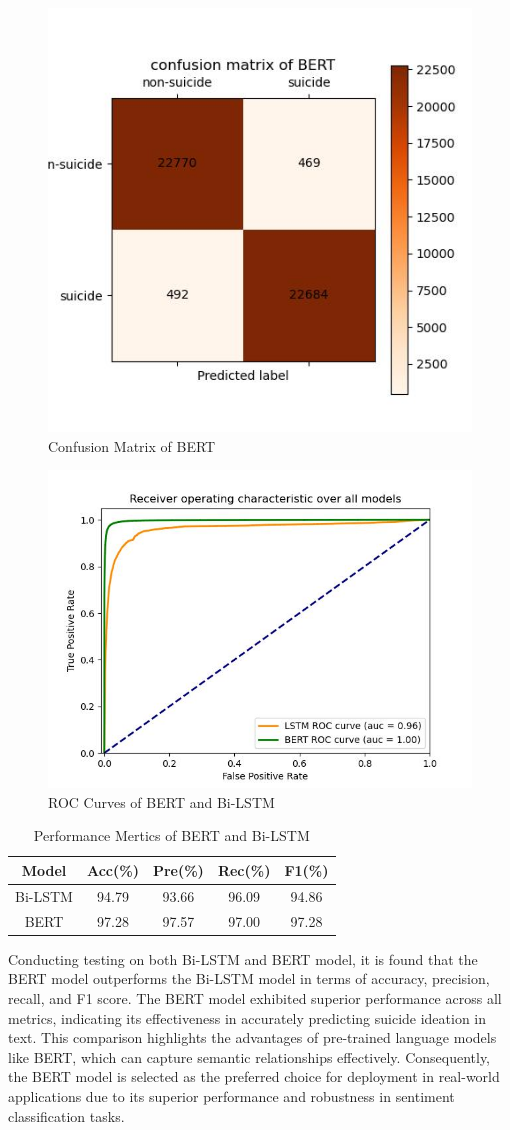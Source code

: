 \documentclass[ %
                    author={Bocheng Wang},
                supervisor={Dr. Qiang Liu},
                    degree={MSc},
                     title={A Research on Identification of Suicide Ideation in Texts with Multiple Models},
                      type={},
                      year={2024}]{dissertation}
\begin{document}
\begin{figure}[h]
      \centering
      \includegraphics[width=0.46\linewidth]{../img/cm_BERT.jpg}
      \caption{Confusion Matrix of BERT}
      \label{fig:cm_BERT}
\end{figure}

\begin{figure}[!h]
      \centering
      \includegraphics[width=0.5\linewidth]{../img/roc_BERT&LSTM.jpg}
      \caption{ROC Curves of BERT and Bi-LSTM}
      \label{fig:rocLSTMBERT}
\end{figure}

\begin{table}[!h]
      \centering
      \begin{tabular}{c|cccc}
            \hline
            Model & Acc(\%) & Pre(\%) & Rec(\%) & F1(\%) \\
            \hline
            Bi-LSTM & 94.79 & 93.66 & 96.09 & 94.86 \\
            BERT    & 97.28 & 97.57 & 97.00 & 97.28 \\
            \hline
      \end{tabular}
      \caption{Performance Mertics of BERT and Bi-LSTM}
      \label{tab:bertmetrics}
\end{table}

Conducting testing on both Bi-LSTM and BERT model, it is found that the BERT model outperforms the Bi-LSTM model in terms of accuracy, precision, recall, and F1 score. The BERT model exhibited superior performance across all metrics, indicating its effectiveness in accurately predicting suicide ideation in text. This comparison highlights the advantages of pre-trained language models like BERT, which can capture semantic relationships effectively. Consequently, the BERT model is selected as the preferred choice for deployment in real-world applications due to its superior performance and robustness in sentiment classification tasks.
\end{document}
